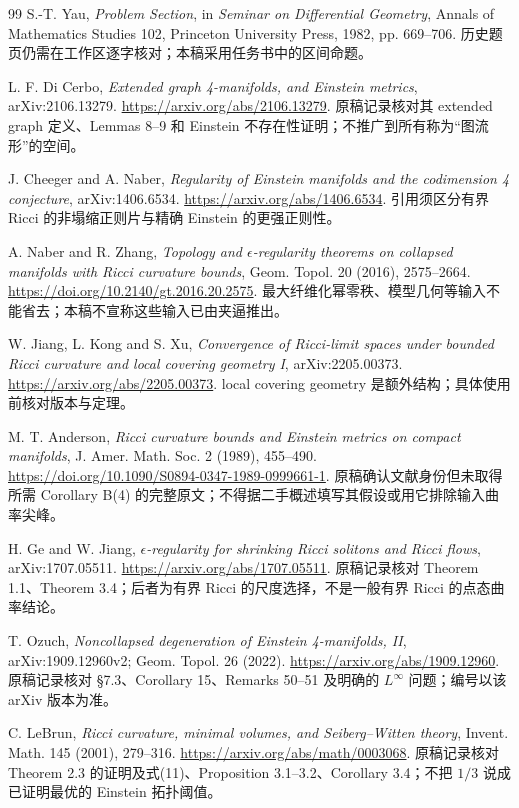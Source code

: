 \documentclass[UTF8,a4paper,11pt,fontset=fandol]{ctexart}
\numberwithin{equation}{section}
\theoremstyle{definition}
\begin{document}
\begin{thebibliography}{99}
 S.-T. Yau, \emph{Problem Section}, in \emph{Seminar on Differential Geometry}, Annals of Mathematics Studies 102, Princeton University Press, 1982, pp. 669--706. 历史题页仍需在工作区逐字核对；本稿采用任务书中的区间命题。

 L. F. Di Cerbo, \emph{Extended graph 4-manifolds, and Einstein metrics}, arXiv:2106.13279. \url{https://arxiv.org/abs/2106.13279}. 原稿记录核对其 extended graph 定义、Lemmas 8--9 和 Einstein 不存在性证明；不推广到所有称为“图流形”的空间。

 J. Cheeger and A. Naber, \emph{Regularity of Einstein manifolds and the codimension 4 conjecture}, arXiv:1406.6534. \url{https://arxiv.org/abs/1406.6534}. 引用须区分有界 Ricci 的非塌缩正则片与精确 Einstein 的更强正则性。

 A. Naber and R. Zhang, \emph{Topology and $\epsilon$-regularity theorems on collapsed manifolds with Ricci curvature bounds}, Geom. Topol. 20 (2016), 2575--2664. \url{https://doi.org/10.2140/gt.2016.20.2575}. 最大纤维化幂零秩、模型几何等输入不能省去；本稿不宣称这些输入已由夹逼推出。

 W. Jiang, L. Kong and S. Xu, \emph{Convergence of Ricci-limit spaces under bounded Ricci curvature and local covering geometry I}, arXiv:2205.00373. \url{https://arxiv.org/abs/2205.00373}. local covering geometry 是额外结构；具体使用前核对版本与定理。

 M. T. Anderson, \emph{Ricci curvature bounds and Einstein metrics on compact manifolds}, J. Amer. Math. Soc. 2 (1989), 455--490. \url{https://doi.org/10.1090/S0894-0347-1989-0999661-1}. 原稿确认文献身份但未取得所需 Corollary B(4) 的完整原文；不得据二手概述填写其假设或用它排除输入曲率尖峰。

 H. Ge and W. Jiang, \emph{$\epsilon$-regularity for shrinking Ricci solitons and Ricci flows}, arXiv:1707.05511. \url{https://arxiv.org/abs/1707.05511}. 原稿记录核对 Theorem 1.1、Theorem 3.4；后者为有界 Ricci 的尺度选择，不是一般有界 Ricci 的点态曲率结论。

 T. Ozuch, \emph{Noncollapsed degeneration of Einstein 4-manifolds, II}, arXiv:1909.12960v2; Geom. Topol. 26 (2022). \url{https://arxiv.org/abs/1909.12960}. 原稿记录核对 \S7.3、Corollary 15、Remarks 50--51 及明确的 $L^\infty$ 问题；编号以该 arXiv 版本为准。

 C. LeBrun, \emph{Ricci curvature, minimal volumes, and Seiberg--Witten theory}, Invent. Math. 145 (2001), 279--316. \url{https://arxiv.org/abs/math/0003068}. 原稿记录核对 Theorem 2.3 的证明及式(11)、Proposition 3.1--3.2、Corollary 3.4；不把 $1/3$ 说成已证明最优的 Einstein 拓扑阈值。


\end{thebibliography}
\end{document}
